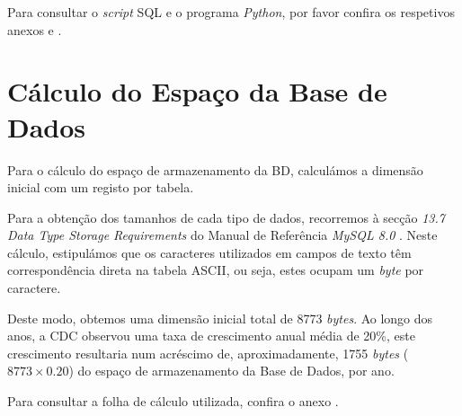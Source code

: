 \documentclass[a4paper,12pt]{scrreprt}
\begin{document}
Para consultar o \textit{script} SQL e o programa \textit{Python}, por favor confira os respetivos anexos \textit{} e \textit{}.

\section{Cálculo do Espaço da Base de Dados}

Para o cálculo do espaço de armazenamento da BD, calculámos a dimensão inicial com um registo por tabela.

Para a obtenção dos tamanhos de cada tipo de dados, recorremos à secção \textit{13.7 Data Type Storage Requirements} do Manual de Referência \textit{MySQL 8.0} \cite{MySQLManual}. Neste cálculo, estipulámos que os caracteres utilizados em campos de texto têm correspondência direta na tabela ASCII, ou seja, estes ocupam um \textit{byte} por caractere.

Deste modo, obtemos uma dimensão inicial total de 8773 \textit{bytes}. Ao longo dos anos, a CDC observou uma taxa de crescimento anual média de 20\%, este crescimento resultaria num acréscimo de, aproximadamente, 1755 \textit{bytes} ($8773 \times 0.20$) do espaço de armazenamento da Base de Dados, por ano.

Para consultar a folha de cálculo utilizada, confira o anexo \textit{}.

\end{document}
